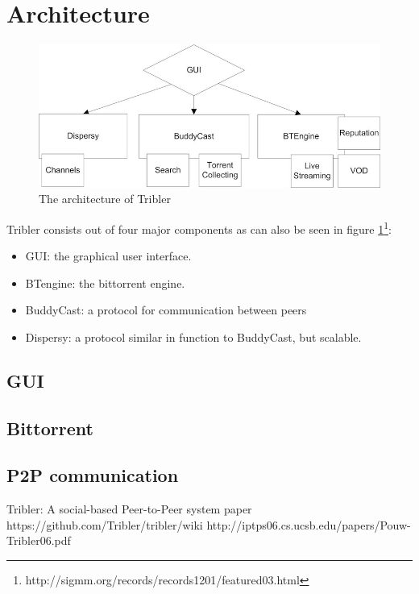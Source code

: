 \section{Architecture}

\begin{figure}[h]
	\centering
	\includegraphics[scale=0.4]{tribler/images/tribler_component_overview.jpg}
	\caption{The architecture of Tribler}
	\label{fig:tribler_components}
\end{figure}

Tribler consists out of four major components as can also be seen in figure \ref{fig:tribler_components}\footnote {http://sigmm.org/records/records1201/featured03.html}:
\begin{itemize}
	\item GUI: the graphical user interface.
	\item BTengine: the bittorrent engine.
	\item BuddyCast: a protocol for communication between peers
	\item Dispersy: a protocol similar in function to BuddyCast, but scalable.
\end{itemize}

\subsection{GUI}

\subsection{Bittorrent}

\subsection{P2P communication}



Tribler: A social-based Peer-to-Peer system paper
https://github.com/Tribler/tribler/wiki
http://iptps06.cs.ucsb.edu/papers/Pouw-Tribler06.pdf